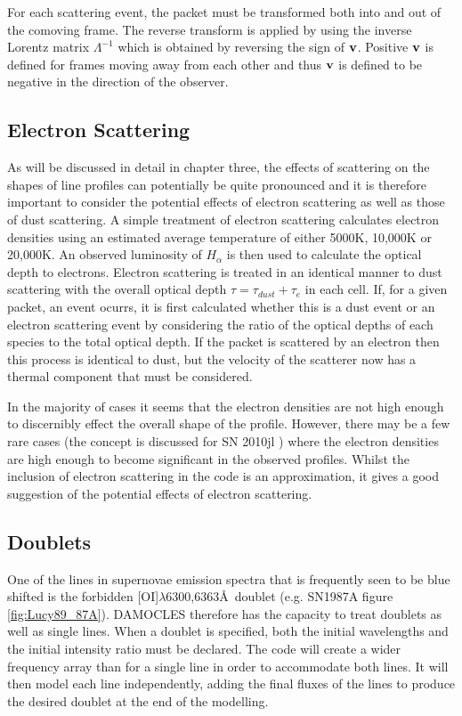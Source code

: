 For each scattering event, the packet must be transformed both into and out of the comoving frame. The reverse transform is applied by using the inverse Lorentz matrix $\Lambda^{-1}$ which is obtained by reversing the sign of $\bf{v}$.  Positive $\bf{v}$ is defined for frames moving away from each other and thus $\bf{v}$ is defined to be negative in the direction of the observer.
	

	\subsection{Electron Scattering}
	As will be discussed in detail in chapter three, the effects of scattering on the shapes of line profiles can potentially be quite pronounced and it is therefore important to consider the potential effects of electron scattering as well as those of dust scattering.  A simple treatment of electron scattering calculates electron densities using an estimated average temperature of either 5000K, 10,000K or 20,000K.  An observed luminosity of $H_{\alpha}$ is then used to calculate the optical depth to electrons.  Electron scattering is treated in an identical manner to dust scattering with the overall optical depth $\tau = \tau_{dust}+\tau_{e}$ in each cell.  If, for a given packet, an event ocurrs, it is first calculated whether this is a dust event or an electron scattering event by considering the ratio of the optical depths of each species to the total optical depth.  If the packet is scattered by an electron then this process is identical to dust, but the velocity of the scatterer now has a thermal component that must be considered.  
	

In the majority of cases it seems that the electron densities are not high enough to discernibly effect the overall shape of the profile.  However, there may be a few rare cases (the concept is discussed for SN 2010jl \citep{Fransson2013}) where the electron densities are high enough to become significant in the observed profiles.  Whilst the inclusion of electron scattering in the code is an approximation, it gives a good suggestion of the potential effects of electron scattering.	
	
	\subsection{Doublets}

One of the lines in supernovae emission spectra that is frequently seen to be blue shifted is the forbidden [OI]$\lambda$6300,6363\AA\ doublet (e.g. SN1987A \citep{LucyEtAl89} figure \ref{fig:Lucy89_87A}).  DAMOCLES therefore has the capacity to treat doublets as well as single lines.  When a doublet is specified, both the initial wavelengths and the initial intensity ratio must be declared.  The code will create a wider frequency array than for a single line in order to accommodate both lines.  It will then model each line independently, adding the final fluxes of the lines to produce the desired doublet at the end of the modelling. 

